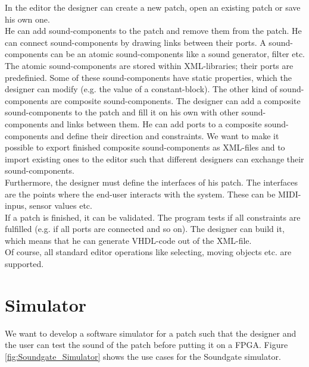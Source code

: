 In the editor the designer can create a new patch, open an existing patch or save his own one. \\
He can add sound-components to the patch and remove them from the patch. He can connect sound-components by drawing links between their ports. A sound-components can be an atomic sound-components like a sound generator, filter etc. The atomic sound-components are stored within XML-libraries; their ports are predefinied. Some of these sound-components have static properties, which the designer can modify (e.g. the value of a constant-block). The other kind of sound-components are composite sound-components. The designer can add a composite sound-components to the patch and fill it on his own with other sound-components and links between them. He can add ports to a composite sound-components and define their direction and constraints. We want to make it possible to export finished composite sound-components as XML-files and to import existing ones to the editor such that different designers can exchange their sound-components.\\
Furthermore, the designer must define the interfaces of his patch. The interfaces are the points where the end-user interacts with the system. These can be MIDI-inpus, sensor values etc.\\
If a patch is finished, it can be validated. The program tests if all constraints are fulfilled (e.g. if all ports are connected and so on). The designer can build it, which means that he can generate VHDL-code out of the XML-file.\\
Of course, all standard editor operations like selecting, moving objects etc. are supported.

\section{Simulator}

We want to develop a software simulator for a patch such that the designer and the user can test the sound of the patch before putting it on a \ac{FPGA}. Figure \ref{fig:Soundgate_Simulator} shows the use cases for the Soundgate simulator.

